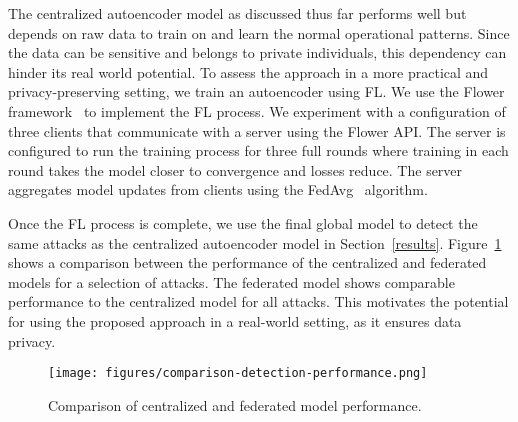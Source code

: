 The centralized autoencoder model as discussed thus far performs well but depends on raw data to train on and learn the normal operational patterns. Since the data can be sensitive and belongs to private individuals, this dependency can hinder its real world potential. To assess the approach in a more practical and privacy-preserving setting, we train an autoencoder using FL. We use the Flower framework~\cite{flower} to implement the FL process. We experiment with a configuration of three clients that communicate with a server using the Flower API. The server is configured to run the training process for three full rounds where training in each round takes the model closer to convergence and losses reduce. The server aggregates model updates from clients using the FedAvg~\cite{fedavg} algorithm. 


Once the FL process is complete, we use the final global model to detect the same attacks as the centralized autoencoder model in Section~\ref{results}. Figure~\ref{fig:FL1} shows a comparison between the performance of the centralized and federated models for a selection of attacks. The federated model shows comparable performance to the centralized model for all attacks. This motivates the potential for using the proposed approach in a real-world setting, as it ensures data privacy.

\begin{figure}[htbp!] 
    \centering 
    \texttt{[image: figures/comparison-detection-performance.png]}
    \caption{Comparison of centralized and federated model performance.}
    \centering
    \label{fig:FL1}
\end{figure}



\iffalse
\begin{figure}[htbp!] 
    \centering 
    \texttt{[image: figures/reconstruction-error-distribution-FL.png]}
    \caption{Distribution of Reconstruction error using FL.}
    \centering
    \label{fig:FL1}
\end{figure}

\begin{figure}[htbp!] 
    \centering 
    \texttt{[image: figures/detection-performance-FL.png]}
    \caption{Detection Performance using FL.}
    \centering
    \label{fig:FL2}
\end{figure}


\begin{figure}[htbp!] 
    \centering 
    \texttt{[image: figures/comparison-recall.png]}
    \caption{Distribution of Reconstruction error using FL.}
    \centering
    \label{fig:FL2}
\end{figure}
\fi

